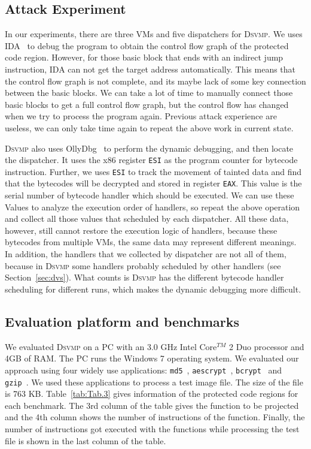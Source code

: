 \documentclass[conference]{IEEEtran}
\newcommand{\DSVMP}{\textsc{Dsvmp}\xspace}
\begin{document}
\subsection{Attack Experiment}
In our experiments, there are three VMs and five dispatchers for \DSVMP. We uses IDA~\cite{14Idapro} to debug the program to obtain the control flow graph of the protected code region. However, for those basic block that ends with an indirect jump instruction, IDA can not get the target address automatically. This means that the control flow graph is not complete, and its maybe lack of some key connection between the basic blocks. We can take a lot of time to manually connect those basic blocks to get a full control flow graph, but the control flow has changed when we try to process the program again. Previous attack experience are useless, we can only take time again to repeat the above work in current state.

\DSVMP also uses OllyDbg~\cite{15Ollydbg} to perform the dynamic debugging, and then locate the dispatcher. It uses the x86 register \texttt{ESI} as the program counter for bytecode instruction. Further, we uses \texttt{ESI} to track the movement of tainted data and find that the bytecodes will be decrypted and stored in register \texttt{EAX}. This value is the serial number of bytecode handler which should be executed. We can use these Values to analyze the execution order of handlers, so repeat the above operation and collect all those values that scheduled by each dispatcher. All these data, however, still cannot restore the execution logic of handlers, because these bytecodes from multiple VMs, the same data may represent different meanings. In addition, the handlers that we collected by dispatcher are not all of them, because in \DSVMP some handlers probably scheduled by other handlers (see Section~\ref{sec:dvs}). What counts is \DSVMP has the different bytecode handler scheduling for different runs, which makes the dynamic debugging more difficult.


\subsection{Evaluation platform and benchmarks}
We evaluated \DSVMP on a PC with an 3.0 GHz Intel Core$^{TM}$ 2 Duo processor and 4GB of RAM.
The PC runs the Windows 7 operating system. We evaluated our approach using four widely use applications: \texttt{md5}~\cite{19md5}, \texttt{aescrypt}~\cite{20Aescrypt}, \texttt{bcrypt}~\cite{21bcrypt} and \texttt{gzip}~\cite{22gzip}.
 We used these applications to process a test image file. The size of the file is 763 KB.
 Table~\ref{tab:Tab.3} gives information of the protected code regions for each benchmark.
 The 3rd column of the table gives the function to be projected and the 4th column shows the number of instructions of the function. Finally, the number of instructions got executed with the functions while processing the test file is shown in the last column of the table.
\end{document}
